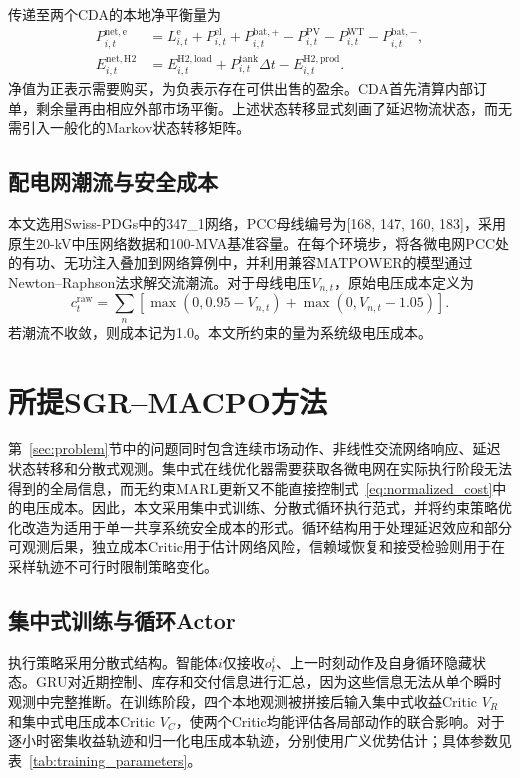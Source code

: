 \documentclass[final,5p,times]{elsarticle}
\begin{document}
传递至两个CDA的本地净平衡量为
\begin{align}
  P_{i,t}^{\mathrm{net,e}} &= L_{i,t}^{\mathrm{e}}+P_{i,t}^{\mathrm{el}}+P_{i,t}^{\mathrm{bat},+}-P_{i,t}^{\mathrm{PV}}-P_{i,t}^{\mathrm{WT}}-P_{i,t}^{\mathrm{bat},-},\label{eq:electric_balance}\\
  E_{i,t}^{\mathrm{net,H2}} &= E_{i,t}^{\mathrm{H2,load}}+P_{i,t}^{\mathrm{tank}}\Delta t-E_{i,t}^{\mathrm{H2,prod}}.\label{eq:h2_balance}
\end{align}
净值为正表示需要购买，为负表示存在可供出售的盈余。CDA首先清算内部订单，剩余量再由相应外部市场平衡。上述状态转移显式刻画了延迟物流状态，而无需引入一般化的Markov状态转移矩阵。

\subsection{配电网潮流与安全成本}

本文选用Swiss-PDGs中的347\_1网络，PCC母线编号为[168, 147, 160, 183]，采用原生20-kV中压网络数据和100-MVA基准容量\cite{swisspdgs}。在每个环境步，将各微电网PCC处的有功、无功注入叠加到网络算例中，并利用兼容MATPOWER的模型通过Newton--Raphson法求解交流潮流\cite{zimmerman2011matpower}。对于母线电压$V_{n,t}$，原始电压成本定义为
\begin{equation}
 c_t^{\mathrm{raw}}=\sum_{n}\left[\max(0,0.95-V_{n,t})
 +\max(0,V_{n,t}-1.05)\right].
\end{equation}
若潮流不收敛，则成本记为1.0。本文所约束的量为系统级电压成本。

\section{所提SGR--MACPO方法}
\label{sec:method}

第~\ref{sec:problem}节中的问题同时包含连续市场动作、非线性交流网络响应、延迟状态转移和分散式观测。集中式在线优化器需要获取各微电网在实际执行阶段无法得到的全局信息，而无约束MARL更新又不能直接控制式~\eqref{eq:normalized_cost}中的电压成本。因此，本文采用集中式训练、分散式循环执行范式，并将约束策略优化改造为适用于单一共享系统安全成本的形式。循环结构用于处理延迟效应和部分可观测后果，独立成本Critic用于估计网络风险，信赖域恢复和接受检验则用于在采样轨迹不可行时限制策略变化。

\subsection{集中式训练与循环Actor}

执行策略采用分散式结构。智能体$i$仅接收$o_t^i$、上一时刻动作及自身循环隐藏状态。GRU对近期控制、库存和交付信息进行汇总，因为这些信息无法从单个瞬时观测中完整推断。在训练阶段，四个本地观测被拼接后输入集中式收益Critic $V_R$和集中式电压成本Critic $V_C$，使两个Critic均能评估各局部动作的联合影响。对于逐小时密集收益轨迹和归一化电压成本轨迹，分别使用广义优势估计；具体参数见表~\ref{tab:training_parameters}。
\end{document}
